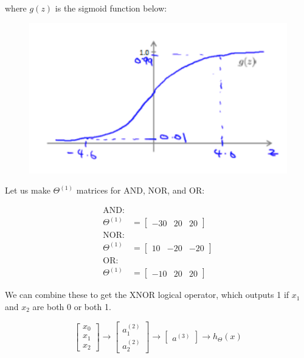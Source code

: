 \documentclass{article}
\begin{document}
        \pagebreak
        \noindent where $g(z)$ is the sigmoid function below:

        \begin{figure}[hbt!]
            \centering
            \includegraphics[scale=0.75]{Resources/OR_Net_Sigmoid}
        \end{figure}

        \noindent Let us make $\Theta^{(1)}$ matrices for AND, NOR, and OR:

        \begin{align*}
            \text{AND:} \\
            \Theta^{(1)} &= \begin{bmatrix} -30 & 20 & 20 \end{bmatrix} \\
            \text{NOR:} \\
            \Theta^{(1)} &= \begin{bmatrix}  10 & -20 & -20 \end{bmatrix} \\
            \text{OR:} \\
            \Theta^{(1)} &= \begin{bmatrix}  -10 & 20 & 20 \end{bmatrix}
        \end{align*}

        \noindent We can combine these to get the XNOR logical operator, which outputs 1 if $x_1$ and $x_2$
        are both 0 or both 1.

        \begin{equation*}
            \begin{bmatrix}
                x_0 \\
                x_1 \\
                x_2
            \end{bmatrix}
            \to
            \begin{bmatrix}
                a_1^{(2)} \\
                a_2^{(2)}
            \end{bmatrix}
            \to
            \begin{bmatrix}
                a^{(3)}
            \end{bmatrix}
            \to h_\Theta(x)
        \end{equation*}
\end{document}
